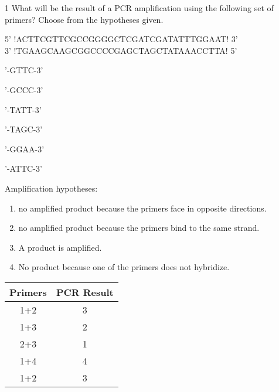 \documentclass[\mainfilename]{subfiles}
\begin{document}
\begin{questionBox}1{ %
    What will be the result of a PCR amplification using the following set of primers? Choose from the hypotheses given.
} %
    \begin{center}
        \renewcommand\DNAblock{5}
        5' \hspace{-16em}\DNA!ACTTCGTTCGCCGGGGCTCGATCGATATTTGGAAT! 3'
        \\
        3' \hspace{-16em}\DNA!TGAAGCAAGCGGCCCCGAGCTAGCTATAAACCTTA! 5'
    \end{center}

    \begin{enumerate}[
        label={Primer \arabic{enumi}:},
        left={0em}
    ]
        \begin{multicols}{2}
            \item {'-GTTC-3'}
            \item {'-GCCC-3'}
            \item {'-TATT-3'}
            \item {'-TAGC-3'}
            \item {'-GGAA-3'}
            \item {'-ATTC-3'}
        \end{multicols}
    \end{enumerate}

    Amplification hypotheses:
    \begin{enumerate}[label=\arabic{enumi}:]
        \item no amplified product because the primers face in opposite directions. 
        \item no amplified product because the primers bind to the same strand.
        \item A product is amplified.
        \item No product because one of the primers does not hybridize.
    \end{enumerate}

    \begin{table}[H]\centering
        \begin{tabular}{c c}
            
            \\\toprule
            
                \multicolumn{1}{c}{Primers}
            &   \multicolumn{1}{c}{PCR Result}
            
            \\\midrule
            
                1+2 & 3
            \\  1+3 & 2
            \\  2+3 & 1
            \\  1+4 & 4
            \\  1+2 & 3
            
            \\\bottomrule
            
        \end{tabular}
    \end{table}

\end{questionBox}
\end{document}
